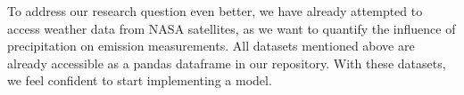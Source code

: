 \documentclass{article}
\begin{document}
To address our research question even better, we have already attempted to access weather data from NASA satellites, as we want to quantify the influence of precipitation on emission measurements. All datasets mentioned above are already accessible as a pandas dataframe in our repository. With these datasets, we feel confident to start implementing a model.









\end{document}
